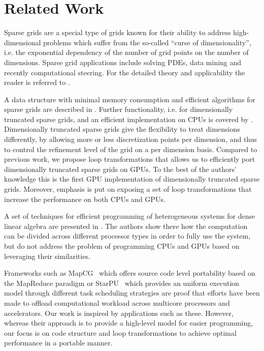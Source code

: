 \section{Related Work}
\label{sec:related_work}
Sparse grids are a special type of grids known for their ability to address
high-dimensional problems which suffer from the so-called ``curse of
dimensionality'', i.e. the exponential dependency of the number of grid points
on the number of dimensions. Sparse grid applications include solving PDEs, data
mining and recently computational steering. For the detailed theory and
applicability the reader is referred to \cite{CambridgeJournals:227245}.

A data structure with minimal memory consumption and efficient algorithms for
sparse grids are described in \cite{Murarasu:2011:CDS:1941553.1941559}. Further
functionality, i.e. for dimensionally truncated sparse grids, and an efficient
implementation on CPUs is covered by \cite{murarasu12fastsg:}. Dimensionally
truncated sparse grids give the flexibility to treat dimensions differently, by
allowing more or less discretization points per dimension, and thus to control
the refinement level of the grid on a per dimension basis. Compared to previous
work, we propose loop transformations that allows us to efficiently port
dimensionally truncated sparse grids on GPUs. To the best of the authors'
knowledge this is the first GPU implementation of dimensionally truncated sparse
grids. Moreover, emphasis is put on exposing a set of loop transformations that
increase the performance on both CPUs and GPUs.

A set of techniques for efficient programming of heterogeneous systems for dense
linear algebra are presented in \cite{Tomov:2010:TDL:1805333.1805388}. The
authors show there how the computation can be divided across different processor
types in order to fully use the system, but do not address the problem of
programming CPUs and GPUs based on leveraging their similarities.

Frameworks such as MapCG~\cite{mapcg} which offers source code level portability
based on the MapReduce paradigm or
StarPU~\cite{Augonnet:2011:SUP:1951453.1951454} which provides an uniform
execution model through different task scheduling strategies are proof that
efforts have been made to offload computational workload across multicore
processors and accelerators. Our work is inspired by applications such as these.
However, whereas their approach is to provide a high-level model for easier
programming, our focus is on code structure and loop transformations to achieve
optimal performance in a portable manner.
